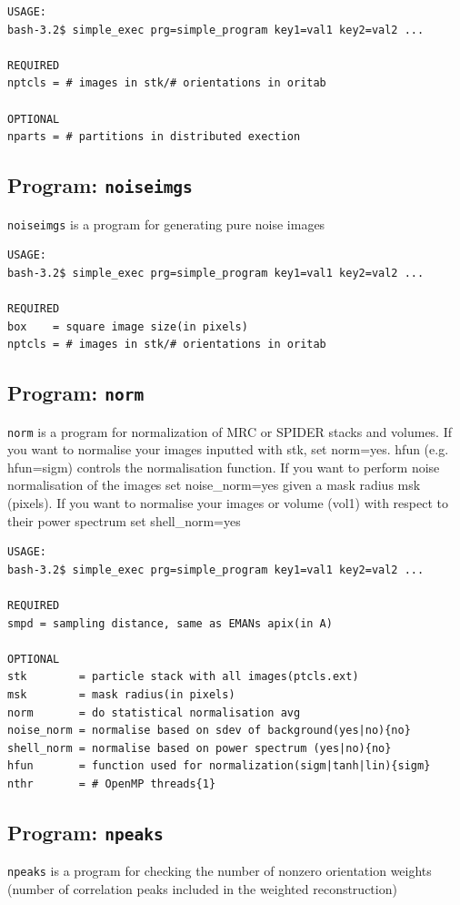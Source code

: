 \documentclass[a4paper,11pt]{article}
\newcommand{\prgname}[1]{\textcolor{NavyBlue}{\texttt{#1}}}
\begin{document}
\begin{verbatim}
USAGE:
bash-3.2$ simple_exec prg=simple_program key1=val1 key2=val2 ...

REQUIRED
nptcls = # images in stk/# orientations in oritab

OPTIONAL
nparts = # partitions in distributed exection
\end{verbatim}

\subsection{Program: \prgname{noiseimgs}}
\label{noiseimgs}
\prgname{noiseimgs} is a program for generating pure noise images

\begin{verbatim}
USAGE:
bash-3.2$ simple_exec prg=simple_program key1=val1 key2=val2 ...

REQUIRED
box    = square image size(in pixels)
nptcls = # images in stk/# orientations in oritab
\end{verbatim}

\subsection{Program: \prgname{norm}}
\label{norm}
\prgname{norm} is a program for normalization of MRC or SPIDER stacks and volumes. If you want to normalise your images inputted with stk, set norm=yes. hfun (e.g. hfun=sigm) controls the normalisation function. If you want to perform noise normalisation of the images set noise\_norm=yes given a mask radius msk (pixels). If you want to normalise your images or volume (vol1) with respect to their power spectrum set shell\_norm=yes 

\begin{verbatim}
USAGE:
bash-3.2$ simple_exec prg=simple_program key1=val1 key2=val2 ...

REQUIRED
smpd = sampling distance, same as EMANs apix(in A)

OPTIONAL
stk        = particle stack with all images(ptcls.ext)
msk        = mask radius(in pixels)
norm       = do statistical normalisation avg
noise_norm = normalise based on sdev of background(yes|no){no}
shell_norm = normalise based on power spectrum (yes|no){no}
hfun       = function used for normalization(sigm|tanh|lin){sigm}
nthr       = # OpenMP threads{1}
\end{verbatim}

\subsection{Program: \prgname{npeaks}}
\label{npeaks}
\prgname{npeaks} is a program for checking the number of nonzero orientation weights (number of correlation peaks included in the weighted reconstruction)
\end{document}
